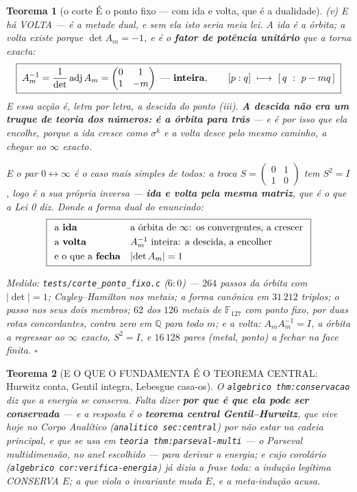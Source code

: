 \documentclass[11pt,a4paper]{article}
\newcommand{\code}[1]{\texttt{\small #1}}
\newtheorem{teorema}{Teorema}
\begin{document}
\begin{teorema}[o corte É o ponto fixo --- com ida e volta, que é a
dualidade]
\emph{(v) E há VOLTA --- é a metade dual, e sem ela isto seria meia lei.} A ida é a
órbita; a volta existe porque $\det A_m=-1$, e é o \textbf{fator de potência unitário}
que a torna exacta:
\[
\boxed{\;A_m^{-1}=\frac{1}{\det}\operatorname{adj}A_m
=\begin{pmatrix}0&1\\1&-m\end{pmatrix}\ \text{---\ \textbf{inteira}},
\qquad
[p:q]\ \longmapsto\ [\,q\ :\ p-mq\,]\;}
\]
E essa acção é, \emph{letra por letra}, a descida do ponto (iii). \textbf{A descida não
era um truque de teoria dos números: é a órbita para trás} --- e é por isso que ela
encolhe, porque a ida cresce como $\sigma^{k}$ e a volta desce pelo mesmo caminho, a
chegar ao $\infty$ exacto.

\noindent E o par $0\leftrightarrow\infty$ é o caso mais simples de todos: a troca
$S=\begin{pmatrix}0&1\\1&0\end{pmatrix}$ tem $S^{2}=I$, logo é a \emph{sua
própria} inversa --- \textbf{ida e volta pela mesma matriz}, que é o que a Lei 0 diz.
Donde a forma dual do enunciado:
\[
\boxed{
\begin{array}{ll}
\text{a \textbf{ida}} & \text{a órbita de }\infty\text{: os convergentes, a crescer}\\[3pt]
\text{a \textbf{volta}} & A_m^{-1}\text{ inteira: a descida, a encolher}\\[3pt]
\text{e o que a \textbf{fecha}} & \lvert\det A_m\rvert=1
\end{array}}
\]

\emph{Medido:} \code{tests/corte\_ponto\_fixo.c} ($6{:}0$) --- $264$ passos da órbita
com $\lvert\det\rvert=1$; Cayley--Hamilton nos metais; a forma canónica em $31\,212$
triplos; o passo nos seus dois membros; $62$ dos $126$ metais de
$\mathbb{F}_{127}$ com ponto fixo, por duas rotas concordantes, contra \emph{zero}
em $\mathbb{Q}$ para todo $m$; e a volta: $A_mA_m^{-1}=I$, a órbita a regressar ao
$\infty$ exacto, $S^{2}=I$, e $16\,128$ pares (metal, ponto) a fechar na face finita.
$\square$
\end{teorema}\begin{teorema}[E O QUE O FUNDAMENTA É O TEOREMA CENTRAL: Hurwitz conta, Gentil integra,
Lebesgue casa-os]\label{thm:central-energia}
O \code{algebrico thm:conservacao} diz \emph{que} a energia se conserva. Falta dizer
\textbf{por que é que ela pode ser conservada} --- e a resposta é o \textbf{teorema
central Gentil--Hurwitz}, que vive hoje no \emph{Corpo Analítico}
(\code{analitico sec:central}) por não estar na cadeia principal, e que se usa em
\code{teoria thm:parseval-multi} --- \emph{o Parseval multidimensão, no anel escolhido} ---
para derivar a energia; e cujo corolário
(\code{algebrico cor:verifica-energia}) já dizia a frase toda: \emph{a indução legítima CONSERVA
$E$; a que viola o invariante muda $E$, e a meta-indução acusa}.


\end{teorema}
\end{document}
